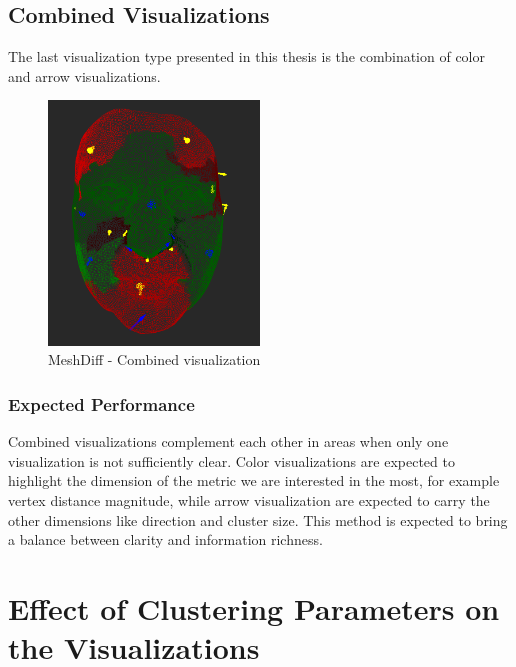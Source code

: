 \subsection{Combined Visualizations}

The last visualization type presented in this thesis is the combination of color and arrow visualizations.

\begin{figure}[h]
\centering
\includegraphics[width=0.5\textwidth]{./img/meshdiff-combination.PNG}
\caption{MeshDiff - Combined visualization}
\label{fig:meshdiff_combination}
\end{figure}

\subsubsection{Expected Performance}

Combined visualizations complement each other in areas when only one visualization is not sufficiently clear. Color visualizations are expected to highlight the dimension of the metric we are interested in the most, for example vertex distance magnitude, while arrow visualization are expected to carry the other dimensions like direction and cluster size. This method is expected to bring a balance between clarity and information richness.
\section{Effect of Clustering Parameters on the Visualizations}
\label{sec:parameter_effect}

